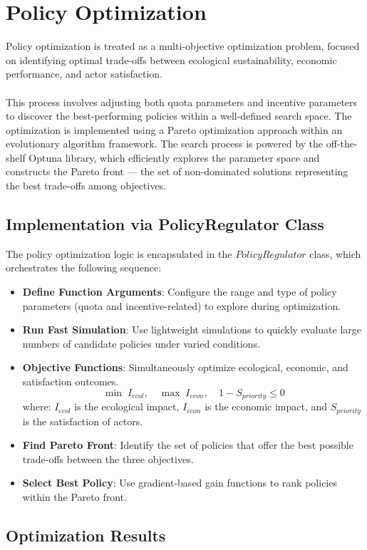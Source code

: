 \documentclass[a4paper, 12pt]{article}
\begin{document}
\section{Policy Optimization}
Policy optimization is treated as a multi-objective optimization problem, focused on identifying optimal trade-offs 
between ecological sustainability, economic performance, and actor satisfaction. 
\\ \\ 
This process involves adjusting both quota parameters and incentive parameters to discover the best-performing policies 
within a well-defined search space. The optimization is implemented using a Pareto optimization approach within an 
evolutionary algorithm framework. The search process is powered by the off-the-shelf Optuna library, which efficiently 
explores the parameter space and constructs the Pareto front — the set of non-dominated solutions representing the best 
trade-offs among objectives.

\subsection{Implementation via PolicyRegulator Class}
The policy optimization logic is encapsulated in the $PolicyRegulator$ class, which orchestrates the following sequence:
\begin{itemize}
    \item \textbf{Define Function Arguments}: Configure the range and type of policy parameters (quota and incentive-related) to explore during optimization.
    \item \textbf{Run Fast Simulation}: Use lightweight simulations to quickly evaluate large numbers of candidate policies under varied conditions.
    \item \textbf{Objective Functions}: Simultaneously optimize ecological, economic, and satisfaction outcomes.
\[
\min \; I_{ecol}, \quad
\max \; I_{econ}, \quad
1 - S_{priority} \leq 0
\]
where: $I_{ecol}$ is the ecological impact, $I_{econ}$ is the economic impact, and $S_{priority}$ is the satisfaction of actors.
    \item \textbf{Find Pareto Front}: Identify the set of policies that offer the best possible trade-offs between the three objectives.
    \item \textbf{Select Best Policy}: Use gradient-based gain functions to rank policies within the Pareto front.
\end{itemize}

\subsection{Optimization Results}
\end{document}
